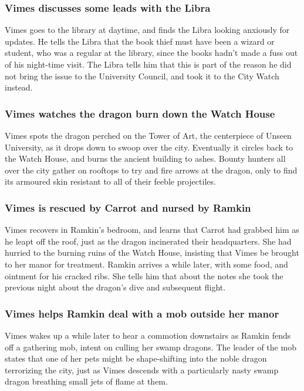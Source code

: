 \subsubsection{\Gls{Vimes} discusses some leads with the \Gls{Libra}}
\Gls{Vimes} goes to the library at daytime, and finds the \Gls{Libra} looking anxiously for updates.
He tells the \Gls{Libra} that the book thief must have been a wizard or student, who was a regular
at the library, since the books hadn't made a fuss out of his night-time visit. The \Gls{Libra}
tells him that this is part of the reason he did not bring the issue to the University Council, and
took it to the City Watch instead.

\subsubsection{\Gls{Vimes} watches the dragon burn down the Watch House}
\Gls{Vimes} spots the dragon perched on the Tower of Art, the centerpiece of Unseen University, as
it drops down to swoop over the city. Eventually it circles back to the Watch House, and burns the
ancient building to ashes. Bounty hunters all over the city gather on rooftops to try and fire
arrows at the dragon, only to find its armoured skin resistant to all of their feeble projectiles.

\subsubsection{\Gls{Vimes} is rescued by \Gls{Carrot} and nursed by \Gls{Ramkin}}
\Gls{Vimes} recovers in \Gls{Ramkin}'s bedroom, and learns that \Gls{Carrot} had grabbed him as he
leapt off the roof, just as the dragon incinerated their headquarters. She had hurried to the
burning ruins of the Watch House, insisting that \Gls{Vimes} be brought to her manor for treatment.
\Gls{Ramkin} arrives a while later, with some food, and ointment for his cracked ribs. She tells him
that about the notes she took the previous night about the dragon's dive and subsequent flight.

\subsubsection{\Gls{Vimes} helps \Gls{Ramkin} deal with a mob outside her manor}
\Gls{Vimes} wakes up a while later to hear a commotion downstairs as \Gls{Ramkin} fends off a
gathering mob, intent on culling her swamp dragons. The leader of the mob states that one of her
pets might be shape-shifting into the noble dragon terrorizing the city, just as \Gls{Vimes}
descends with a particularly nasty swamp dragon breathing small jets of flame at them.

